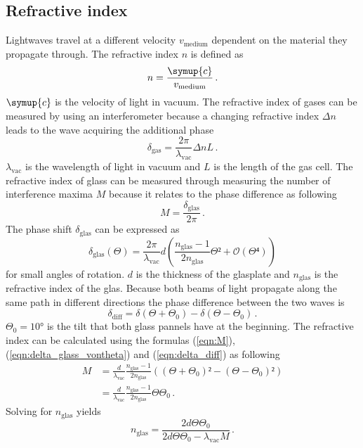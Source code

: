  \subsection{Refractive index}
 Lightwaves travel at a different velocity $v_{\text{medium}}$ dependent on the material they propagate through. 
 The refractive index $n$ is defined as 
 \begin{equation}
    n = \frac{\symup{c}}{v_{\text{medium}}} \, .
 \end{equation}
 $\symup{c}$ is the velocity of light in vacuum. 
 The refractive index of gases can be measured by using an interferometer because a changing refractive 
 index $\Delta n$ leads to the wave acquiring the additional phase 
 \begin{equation}
    \delta_{\text{gas}} = \frac{2 \pi}{\lambda_{\text{vac}}} \Delta n L \, . \label{eqn:delta_gas}
 \end{equation}
 $\lambda_{\text{vac}}$ is the wavelength of light in vacuum and $L$ is the length of the gas cell. 
 The refractive index of glass can be measured through measuring the number of interference maxima $M$
 because it relates to the phase difference as following 
 \begin{equation}
    M = \frac{\delta_{\text{glas}}}{2\pi} \label{eqn:M} \, .
 \end{equation}
 The phase shift $\delta_{\text{glas}}$ can be expressed as 
 \begin{equation}
    \delta_{\text{glas}}(\Theta) = \frac{2 \pi}{\lambda_{\text{vac}}} d \left( \frac{n_{\text{glas}}-1}{2n_{\text{glas}}} \Theta² + \mathcal{O}(\Theta⁴)\right) 
    \label{eqn:delta_glass_vontheta}
 \end{equation}
 for small angles of rotation. 
 $d$ is the thickness of the glasplate and $n_{\text{glas}}$ is the refractive index of the glas. 
 Because both beams of light propagate along the same path in different directions the phase difference between the two waves is 
 \begin{equation}
    \delta_{\text{diff}} = \delta(\Theta + \Theta_0) - \delta(\Theta - \Theta_0) \label{eqn:delta_diff} \, .
 \end{equation}
 $\Theta_0 = 10°$ is the tilt that both glass pannels have at the beginning. The refractive index can be calculated using 
 the formulas (\ref{eqn:M}), (\ref{eqn:delta_glass_vontheta}) and (\ref{eqn:delta_diff}) as following 
 \begin{align*}
    M &= \frac{d}{\lambda_{\text{vac}}} \frac{n_{\text{glas}}-1}{2n_{\text{glas}}} \left( (\Theta + \Theta_0)² - (\Theta - \Theta_0)²\right) \\
    &= \frac{d}{\lambda_{\text{vac}}} \frac{n_{\text{glas}}-1}{2n_{\text{glas}}} \Theta \Theta_0    
    \, . 
 \end{align*}
 Solving for $n_{\text{glas}}$ yields 
 \begin{equation}
    n_{\text{glas}} = \frac{2d \Theta \Theta_0}{2d \Theta \Theta_0 - \lambda_{\text{vac}}M} \, .
 \end{equation}